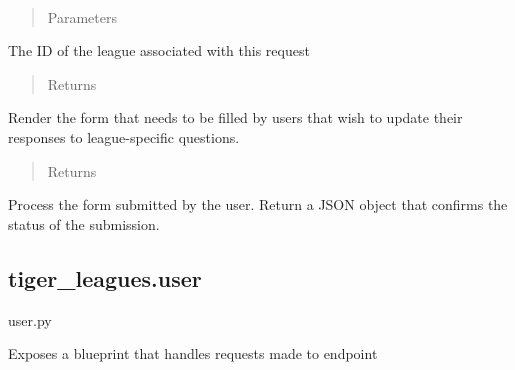\documentclass[letterpaper,10pt,english]{sphinxmanual}
\begin{document}
\begin{fulllineitems}
\label{\detokenize{tiger_leagues/readme:tiger_leagues.league.update_responses}}~\begin{quote}\begin{description}
\item[{Parameters}] \leavevmode
{} \textendash{} 

\end{description}\end{quote}

The ID of the league associated with this request
\begin{quote}\begin{description}
\item[{Returns}] \leavevmode
{}

\end{description}\end{quote}

Render the form that needs to be filled by users that wish to update their responses 
to league-specific questions.
\begin{quote}\begin{description}
\item[{Returns}] \leavevmode
{}

\end{description}\end{quote}

Process the form submitted by the user. Return 
a JSON object that confirms the status of the submission.

\end{fulllineitems}



\subsection{tiger\_leagues.user}
\label{\detokenize{tiger_leagues/readme:module-tiger_leagues.user}}\label{\detokenize{tiger_leagues/readme:tiger-leagues-user}}
user.py

Exposes a blueprint that handles requests made to  endpoint
\end{document}
